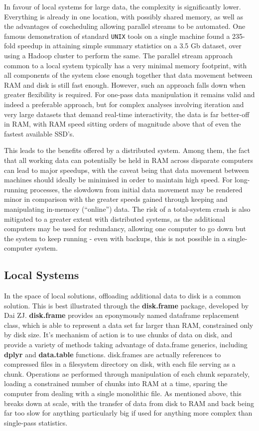 In favour of local systems for large data, the complexity is significantly lower.
Everything is already in one location, with possibly shared memory, as well as the advantages of coscheduling allowing parallel streams to be automated.
One famous demonstration of standard \texttt{UNIX} tools on a single machine found a 235-fold speedup in attaining simple summary statistics on a 3.5 Gb dataset, over using a Hadoop cluster to perform the same\cite{drake2014cltvscluster}.
The parallel stream approach common to a local system typically has a very minimal memory footprint, with all components of the system close enough together that data movement between RAM and disk is still fast enough.
However, such an approach falls down when greater flexibility is required.
For one-pass data manipulation it remains valid and indeed a preferable approach, but for complex analyses involving iteration and very large datasets that demand real-time interactivity, the data is far better-off in RAM, with RAM speed sitting orders of magnitude above that of even the fastest available SSD's\cite{kim201923}\cite{samsung2020SSD}.

This leads to the benefits offered by a distributed system.
Among them, the fact that all working data can potentially be held in RAM across disparate computers can lead to major speedups, with the caveat being that data movement between machines should ideally be minimised in order to maintain high speed.
For long-running processes, the slowdown from initial data movement may be rendered minor in comparison with the greater speeds gained through keeping and manipulating in-memory (``online'') data\cite{emmerich2000engineering}.
The risk of a total-system crash is also mitigated to a greater extent with distributed systems, as the additional computers may be used for redundancy, allowing one computer to go down but the system to keep running - even with backups, this is not possible in a single-computer system.

\subsection{Local Systems}

In the space of local solutions, offloading additional data to disk is a common solution.
This is best illustrated through the \textbf{disk.frame} package, developed by Dai ZJ.
\textbf{disk.frame} provides an eponymously named dataframe replacement class, which is able to represent a data  set far larger than RAM, constrained only by disk size\cite{zj20}.
It's mechanism of action is to use chunks of data on disk, and provide a variety of methods taking advantage of data.frame generics, including \textbf{dplyr} and \textbf{data.table} functions.
disk.frames are actually references to compressed files in a filesystem directory on disk, with each file serving as a chunk.
Operations ae performed through manipulation of each chunk separately, loading a constrained number of chunks into RAM at a time, sparing the computer from dealing with a single monolithic file\cite{zj19:_inges_data}.
As mentioned above, this breaks down at scale, with the transfer of data from disk to RAM and back being far too slow for anything particularly big if used for anything more complex than single-pass statistics.

